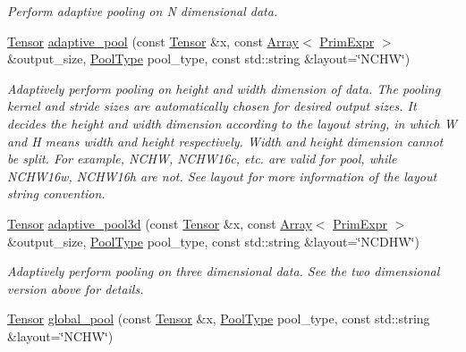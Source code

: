 \begin{DoxyCompactItemize}
\begin{DoxyCompactList}\small\item\em Perform adaptive pooling on N dimensional data. \end{DoxyCompactList}\item 
\hyperlink{classtvm_1_1te_1_1Tensor}{Tensor} \hyperlink{namespacetopi_1_1nn_af721a019c13f1f99dc43d5d49cc71388}{adaptive\+\_\+pool} (const \hyperlink{classtvm_1_1te_1_1Tensor}{Tensor} \&x, const \hyperlink{classtvm_1_1Array}{Array}$<$ \hyperlink{classtvm_1_1PrimExpr}{Prim\+Expr} $>$ \&output\+\_\+size, \hyperlink{namespacetopi_1_1nn_ac531cfce9c3a031fa25cfb6ed1f9b95b}{Pool\+Type} pool\+\_\+type, const std\+::string \&layout=\char`\"{}N\+C\+HW\char`\"{})
\begin{DoxyCompactList}\small\item\em Adaptively perform pooling on height and width dimension of data. The pooling kernel and stride sizes are automatically chosen for desired output sizes. It decides the height and width dimension according to the layout string, in which \textquotesingle{}W\textquotesingle{} and \textquotesingle{}H\textquotesingle{} means width and height respectively. Width and height dimension cannot be split. For example, N\+C\+HW, N\+C\+H\+W16c, etc. are valid for pool, while N\+C\+H\+W16w, N\+C\+H\+W16h are not. See {\itshape layout} for more information of the layout string convention. \end{DoxyCompactList}\item 
\hyperlink{classtvm_1_1te_1_1Tensor}{Tensor} \hyperlink{namespacetopi_1_1nn_ad48c57c26ce6bb02576555a4cb11bcd3}{adaptive\+\_\+pool3d} (const \hyperlink{classtvm_1_1te_1_1Tensor}{Tensor} \&x, const \hyperlink{classtvm_1_1Array}{Array}$<$ \hyperlink{classtvm_1_1PrimExpr}{Prim\+Expr} $>$ \&output\+\_\+size, \hyperlink{namespacetopi_1_1nn_ac531cfce9c3a031fa25cfb6ed1f9b95b}{Pool\+Type} pool\+\_\+type, const std\+::string \&layout=\char`\"{}N\+C\+D\+HW\char`\"{})
\begin{DoxyCompactList}\small\item\em Adaptively perform pooling on three dimensional data. See the two dimensional version above for details. \end{DoxyCompactList}\item 
\hyperlink{classtvm_1_1te_1_1Tensor}{Tensor} \hyperlink{namespacetopi_1_1nn_ac5fe64687aa8bffee420bf282f2b8f8c}{global\+\_\+pool} (const \hyperlink{classtvm_1_1te_1_1Tensor}{Tensor} \&x, \hyperlink{namespacetopi_1_1nn_ac531cfce9c3a031fa25cfb6ed1f9b95b}{Pool\+Type} pool\+\_\+type, const std\+::string \&layout=\char`\"{}N\+C\+HW\char`\"{})

\end{DoxyCompactItemize}
